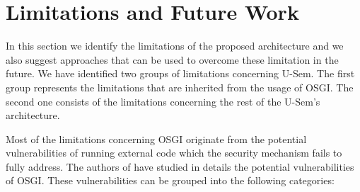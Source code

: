 \section{Limitations and Future Work}
\label{sec:limitsPlugin}

In this section we identify the limitations of the proposed architecture and we also suggest approaches that can be used to overcome these limitation in the future. We have identified two groups of limitations concerning U-Sem. The first group represents the limitations that are inherited from the usage of OSGI. The second one consists of the limitations concerning the rest of the U-Sem's architecture.

Most of the limitations concerning OSGI originate from the potential vulnerabilities of running external code which the security mechanism fails to fully address. The authors of \cite{parrend2009security} have studied in details the potential vulnerabilities of OSGI. These vulnerabilities can be grouped into the following categories:

